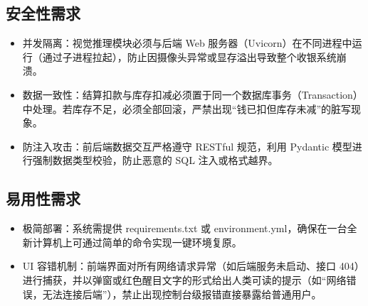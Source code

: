 \subsection{安全性需求}
\begin{itemize}[leftmargin=2em]
  \item 并发隔离：视觉推理模块必须与后端 Web 服务器（Uvicorn）在不同进程中运行（通过子进程拉起），防止因摄像头异常或显存溢出导致整个收银系统崩溃。
  \item 数据一致性：结算扣款与库存扣减必须置于同一个数据库事务（Transaction）中处理。若库存不足，必须全部回滚，严禁出现“钱已扣但库存未减”的脏写现象。
  \item 防注入攻击：前后端数据交互严格遵守 RESTful 规范，利用 Pydantic 模型进行强制数据类型校验，防止恶意的 SQL 注入或格式越界。
\end{itemize}

\subsection{易用性需求}
\begin{itemize}[leftmargin=2em]
  \item 极简部署：系统需提供 requirements.txt 或 environment.yml，确保在一台全新计算机上可通过简单的命令实现一键环境复原。
  \item UI 容错机制：前端界面对所有网络请求异常（如后端服务未启动、接口 404）进行捕获，并以弹窗或红色醒目文字的形式给出人类可读的提示（如“网络错误，无法连接后端”），禁止出现控制台级报错直接暴露给普通用户。
\end{itemize}

